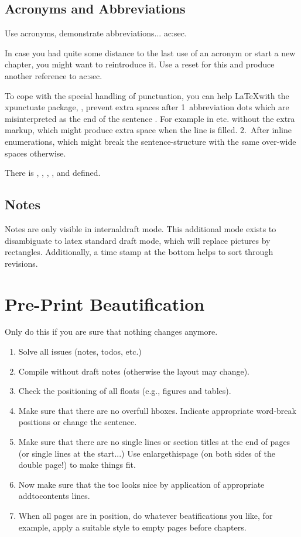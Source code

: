 \subsection{Acronyms and Abbreviations}
Use acronyms, demonstrate abbreviations... \Gls{ac:sec}.

In case you had quite some distance to the last use of an acronym or start a new chapter, you might want to reintroduce it. Use a reset for this and produce another reference to \gls{ac:sec}.

To cope with the special handling of punctuation, you can help \LaTeX with the xpunctuate package, \ie, prevent extra spaces after 1\xperiod{}~abbreviation dots which are misinterpreted as the end of the sentence \etc. For example in etc. without the extra markup, which might produce extra space when the line is filled. 2.~After inline enumerations, which might break the sentence-structure with the same over-wide spaces otherwise.

There is \eg, \Eg, \ie \Ie, \etc, and \Etc defined.



\subsection{Notes}

Notes are only visible in internaldraft mode. 
This additional mode exists to disambiguate to latex standard draft mode, which will replace pictures by rectangles. 
Additionally, a time stamp at the bottom helps to sort through revisions.




\section{Pre-Print Beautification}
\label{sec:pre-print-beaut}

Only do this if you are sure that nothing changes anymore.

\begin{enumerate}
\item Solve all issues (notes, todos, etc.)
\item Compile without draft notes (otherwise the layout may change).
\item Check the positioning of all floats (e.g., figures and tables).
\item Make sure that there are no overfull hboxes. Indicate appropriate word-break positions or change the sentence.
\item Make sure that there are no single lines or section titles at the end of pages (or single lines at the start...) Use enlargethispage (on both sides of the double page!) to make things fit.
\item Now make sure that the toc looks nice by application of appropriate addtocontents lines.
\item When all pages are in position, do whatever beatifications you like, for example, apply a suitable style to empty pages before chapters.
\end{enumerate}

